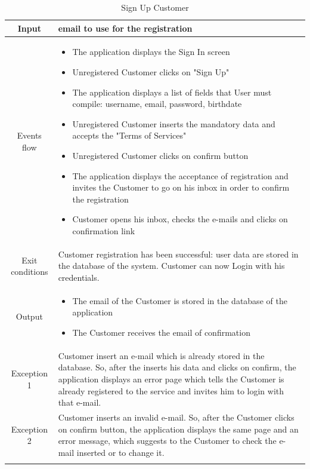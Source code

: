 \begin{longtable}{ | c | p{10cm} | }
    Input            & email to use for the registration \\ \hline
    Events flow      & \begin{itemize}[nosep,after=\strut]
        \item The application displays the Sign In screen
        \item Unregistered Customer clicks on "Sign Up"
        \item The application displays a list of fields that User must compile: username, email, password, birthdate
        \item Unregistered Customer inserts the mandatory data and accepts the "Terms of Services"
        \item Unregistered Customer clicks on confirm button
        \item The application displays the acceptance of registration and invites the Customer to go on his inbox in order to confirm the registration
        \item Customer opens his inbox, checks the e-mails and clicks on confirmation link
    \end{itemize} \\
    \hline
    Exit conditions  & Customer registration has been successful: user data are stored in the database of the system. Customer can now Login with his credentials. \\ \hline
    Output           & \begin{itemize}
        \item The email of the Customer is stored in the database of the application
        \item The Customer receives the email of confirmation
    \end{itemize} \\
    \hline
    \hline
    Exception 1      & Customer insert an e-mail which is already stored in the database. So, after the inserts his data and clicks on confirm, the application displays an error page which tells the Customer is already registered to the service and invites him to login with that e-mail. \\
    \hline
    Exception 2      & Customer inserts an invalid e-mail. So, after the Customer clicks on confirm button, the application displays the same page and an error message, which suggests to the Customer to check the e-mail inserted or to change it. \\
    \hline
    \caption{Sign Up Customer} \\
\end{longtable}
